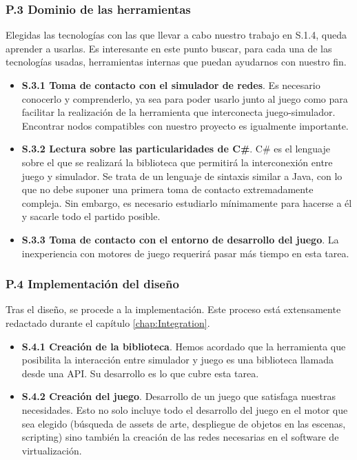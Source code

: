 \subsubsection{P.3 Dominio de las herramientas}
Elegidas las tecnologías con las que llevar a cabo nuestro trabajo en S.1.4, queda aprender a usarlas. Es interesante en este punto buscar, para cada una de las tecnologías usadas, herramientas internas que puedan ayudarnos con nuestro fin.
\begin{itemize}
\item \textbf{S.3.1 Toma de contacto con el simulador de redes}. Es necesario conocerlo y comprenderlo, ya sea para poder usarlo junto al juego como para facilitar la realización de la herramienta que interconecta juego-simulador. Encontrar nodos compatibles con nuestro proyecto es igualmente importante.
\item \textbf{S.3.2 Lectura sobre las particularidades de C\#}. C\# es el lenguaje sobre el que se realizará la biblioteca que permitirá la interconexión entre juego y simulador. Se trata de un lenguaje de sintaxis similar a Java, con lo que no debe suponer una primera toma de contacto extremadamente compleja. Sin embargo, es necesario estudiarlo mínimamente para hacerse a él y sacarle todo el partido posible.
\item \textbf{S.3.3 Toma de contacto con el entorno de desarrollo del juego}. La inexperiencia con motores de juego requerirá pasar más tiempo en esta tarea.
\end{itemize}

\subsubsection{P.4 Implementación del diseño}
Tras el diseño, se procede a la implementación. Este proceso está extensamente redactado durante el capítulo \ref{chap:Integration}.
\begin{itemize}
\item \textbf{S.4.1 Creación de la biblioteca}. Hemos acordado que la herramienta que posibilita la interacción entre simulador y juego es una biblioteca llamada desde una API. Su desarrollo es lo que cubre esta tarea. 
\item \textbf{S.4.2 Creación del juego}. Desarrollo de un juego que satisfaga nuestras necesidades. Esto no solo incluye todo el desarrollo del juego en el motor que sea elegido (búsqueda de assets de arte, despliegue de objetos en las escenas, scripting) sino también la creación de las redes necesarias en el software de virtualización.
\end{itemize}

